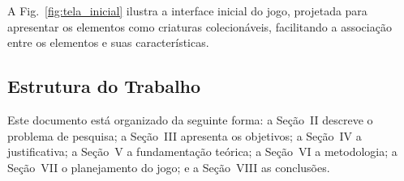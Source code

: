 A Fig.~\ref{fig:tela_inicial} ilustra a interface inicial do jogo, projetada
para apresentar os elementos como criaturas colecionáveis, facilitando a associação
entre os elementos e suas características.

\subsection{Estrutura do Trabalho}

Este documento está organizado da seguinte forma: a Seção~II descreve o problema
de pesquisa; a Seção~III apresenta os objetivos; a Seção~IV a justificativa;
a Seção~V a fundamentação teórica; a Seção~VI a metodologia; a Seção~VII o
planejamento do jogo; e a Seção~VIII as conclusões.
